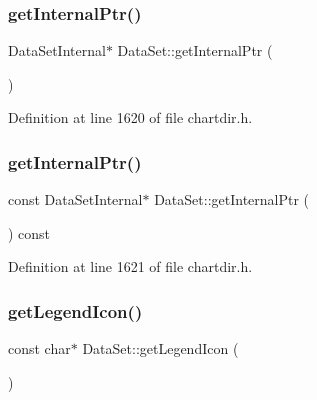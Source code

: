 \subsubsection{\texorpdfstring{get\+Internal\+Ptr()}{getInternalPtr()}\hspace{0.1cm}{\footnotesize\ttfamily [1/2]}}
{\footnotesize\ttfamily Data\+Set\+Internal$\ast$ Data\+Set\+::get\+Internal\+Ptr (\begin{DoxyParamCaption}{ }\end{DoxyParamCaption})\hspace{0.3cm}{\ttfamily [inline]}}



Definition at line 1620 of file chartdir.\+h.

\mbox{\label{class_data_set_af4de1e342c382b3e2b3c3013622d2831}} 
\subsubsection{\texorpdfstring{get\+Internal\+Ptr()}{getInternalPtr()}\hspace{0.1cm}{\footnotesize\ttfamily [2/2]}}
{\footnotesize\ttfamily const Data\+Set\+Internal$\ast$ Data\+Set\+::get\+Internal\+Ptr (\begin{DoxyParamCaption}{ }\end{DoxyParamCaption}) const\hspace{0.3cm}{\ttfamily [inline]}}



Definition at line 1621 of file chartdir.\+h.

\mbox{\label{class_data_set_ab4d4572923940e112a3b4d50da670854}} 
\subsubsection{\texorpdfstring{get\+Legend\+Icon()}{getLegendIcon()}}
{\footnotesize\ttfamily const char$\ast$ Data\+Set\+::get\+Legend\+Icon (\begin{DoxyParamCaption}{ }\end{DoxyParamCaption})\hspace{0.3cm}{\ttfamily [inline]}}




